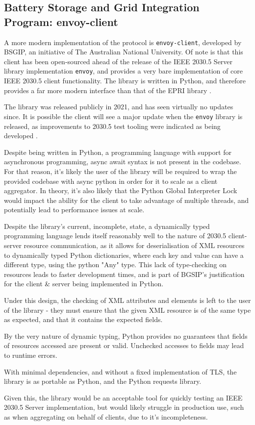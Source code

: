 \subsection{Battery Storage and Grid Integration Program: envoy-client}
A more modern implementation of the protocol is \texttt{envoy-client}, developed by BSGIP, an initiative of The Australian National University. Of note is that this client has been open-sourced ahead of the release of the IEEE 2030.5 Server library implementation \texttt{envoy}, and provides a very bare implementation of core IEEE 2030.5 client functionality. The library is written in Python, and therefore provides a far more modern interface than that of the EPRI library \cite{envoyclient}. 

The library was released publicly in 2021, and has seen virtually no updates since. It is possible the client will see a major update when the \texttt{envoy} library is released, as improvements to 2030.5 test tooling were indicated as being developed \cite{DOEAdoption}. 


Despite being written in Python, a programming language with support for asynchronous programming, async await syntax is not present in the codebase. For that reason, it's likely the user of the library will be required to wrap the provided codebase with async python in order for it to scale as a client aggregator. In theory, it's also likely that the Python Global Interpreter Lock would impact the ability for the client to take advantage of multiple threads, and potentially lead to performance issues at scale. 

Despite the library's current, incomplete, state, a dynamically typed programming language lends itself reasonably well to the nature of 2030.5 client-server resource communication, as it allows for deserialisation of XML resources to dynamically typed Python dictionaries, where each key and value can have a different type, using the python "Any" type. This lack of type-checking on resources leads to faster development times, and is part of BGSIP's justification for the client \& server being implemented in Python. 

Under this design, the checking of XML attributes and elements is left to the user of the library - they must ensure that the given XML resource is of the same type as expected, and that it contains the expected fields. 

By the very nature of dynamic typing, Python provides no guarantees that fields of resources accessed are present or valid. Unchecked accesses to fields may lead to runtime errors. 

With minimal dependencies, and without a fixed implementation of TLS, the library is as portable as Python, and the Python requests library.

Given this, the library would be an acceptable tool for quickly testing an IEEE 2030.5 Server implementation, but would likely struggle in production use, such as when aggregating on behalf of clients, due to it's incompleteness.







